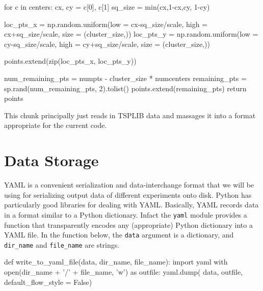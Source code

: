     for c in centers:
        cx, cy = c[0], c[1]
        sq_size      = min(cx,1-cx,cy, 1-cy)

        loc_pts_x    = np.random.uniform(low  = cx-sq_size/scale, 
                                         high = cx+sq_size/scale, 
                                         size = (cluster_size,))
        loc_pts_y    = np.random.uniform(low = cy-sq_size/scale, 
                                         high = cy+sq_size/scale, 
                                         size = (cluster_size,))

        points.extend(zip(loc_pts_x, loc_pts_y))

    num_remaining_pts = numpts - cluster_size * numcenters
    remaining_pts = sp.rand(num_remaining_pts, 2).tolist()
    points.extend(remaining_pts)
    return points
\nwendcode{}\nwdocspar

This chunk principally just reads in TSPLIB data and massages it into a format appropriate for the current code. 

\nwenddocs{}\endmoddef\nwstartdeflinemarkup{}\nwenddeflinemarkup
{}\nwendcode{}\nwdocspar

\section{Data Storage}
YAML\cite{ben2009yaml} is a convenient serialization and data-interchange format that we will be using 
for serializing output data of different experiments onto disk. Python has particularly good libraries for dealing with YAML. Basically, 
YAML records data in a format similar to a Python dictionary. Infact the \texttt{yaml} module provides a function that
transparently encodes any (appropriate) Python dictionary into a YAML file. In the function below, the 
\texttt{data} argument is a dictionary, and \texttt{dir\_name} and \texttt{file\_name} are strings. 
 
\nwenddocs{}\endmoddef\nwstartdeflinemarkup{}\nwenddeflinemarkup
def write_to_yaml_file(data, dir_name, file_name):
   import yaml
   with open(dir_name + '/' + file_name, 'w') as outfile:
          yaml.dump( data, outfile, default_flow_style = False)
\nwendcode{}\nwdocspar


